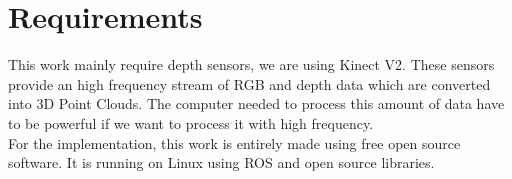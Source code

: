 \section*{Requirements}

This work mainly require depth sensors, we are using Kinect V2. These sensors provide an high frequency stream of RGB and depth data which are converted into 3D Point Clouds. The computer needed to process this amount of data have to be powerful if we want to process it with high frequency. \\
For the implementation, this work is entirely made using free open source software. It is running on Linux using ROS and open source libraries.